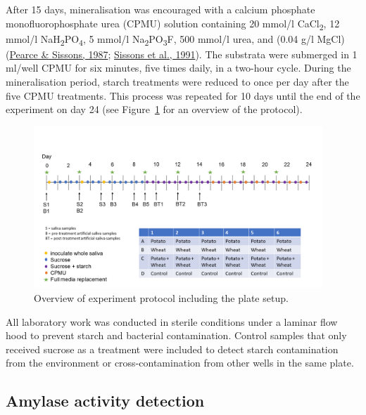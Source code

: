 \documentclass[
  b5paper,
]{book}
\begin{document}
After 15 days, mineralisation was encouraged with a calcium phosphate
monofluorophosphate urea (CPMU) solution containing 20 mmol/l
CaCl\textsubscript{2}, 12 mmol/l
NaH\textsubscript{2}PO\textsubscript{4}, 5 mmol/l
Na\textsubscript{2}PO\textsubscript{3}F, 500 mmol/l urea, and (0.04 g/l
MgCl) (\protect\hyperlink{ref-pearceConcomitantDeposition1987}{Pearce \&
Sissons, 1987};
\protect\hyperlink{ref-sissonsMultistationPlaque1991}{Sissons et al.,
1991}). The substrata were submerged in 1 ml/well CPMU for six minutes,
five times daily, in a two-hour cycle. During the mineralisation period,
starch treatments were reduced to once per day after the five CPMU
treatments. This process was repeated for 10 days until the end of the
experiment on day 24 (see Figure~\ref{fig-protocol} for an overview of
the protocol).

\begin{figure}[H]

{\centering \includegraphics[width=4.27in,height=\textheight]{figures/protocol_overview.png}

}

\caption{\label{fig-protocol}Overview of experiment protocol including
the plate setup.}

\end{figure}

All laboratory work was conducted in sterile conditions under a laminar
flow hood to prevent starch and bacterial contamination. Control samples
that only received sucrose as a treatment were included to detect starch
contamination from the environment or cross-contamination from other
wells in the same plate.

\hypertarget{amylase-activity-detection}{%
\subsection{Amylase activity
detection}\label{amylase-activity-detection}}
\end{document}
